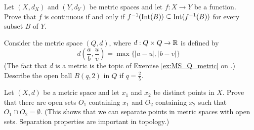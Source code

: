 \item Let $(X, d_X)$ and $(Y, d_Y)$ be metric spaces and let $f: X \to Y$ be a function. Prove that $f$ is continuous if and only if $f^{-1}(\text{Int}(B)) \subseteq \text{Int}(f^{-1}(B))$ for every subset $B$ of $Y$.

\begin{comment}

\ExerciseSolution First suppose that $f$ is continuous. Let $B$ be a subset of $Y$. The fact that $\Int(B)$ is a subset of $B$ implies that $f^{-1}(\Int(B)) \subseteq f^{-1}(B)$. Now $\Int(B)$ is an open set in $Y$, so $f^{-1}(\Int(B))$ is open in $X$. Thus, every point in $f^{-1}(\Int(B))$ is in $\Int(f^{-1}(B))$ and it follows that $f^{-1}(\Int(B)) \subseteq \Int(f^{-1}(B))$.

Now assume that $f^{-1}(\Int(B)) \subseteq \Int(f^{-1}(B))$ for every subset $B$ of $Y$. Let $O$ be an open set in $Y$. Then $O = \Int(O)$ and so $f^{-1}(O) = f^{-1}(\Int(O)) \subseteq \Int(f^{-1}(O))$. Now $\Int(f^{-1}(O)) \subseteq f^{-1}(O)$, so we conclude that  
$f^{-1}(O) = \Int(f^{-1}(O))$. Therefore, $f^{-1}(O)$ is an open set and $f$ is a continuous function.

\end{comment}


\item Consider the metric space $(Q,d)$, where $d : Q \times Q \to \mathbb{R}$ is defined by 
\[d\left(\frac{a}{b}, \frac{u}{v}\right) = \max\{| a-u |, | b-v |\}\]
(The fact that $d$ is a metric is the topic of Exercise \ref{ex:MS_Q_metric} on \pageref{ex:MS_Q_metric}.) Describe the open ball $B(q,2)$ in $Q$ if $q = \frac{2}{5}$.

\begin{comment}

\ExerciseSolution The element $\frac{u}{v}$ in $Q$ is in $B(q,2)$ if 
\[d\left(\frac{2}{5}, \frac{u}{v}\right) = \max\{|a-u|, |b-v|\} < 2.\]
So $|2-u|< 2$ and $|5-v|< 2$. This makes $0 < u < 4$ and $3 < v < 7$. But $u$ and $v$ are integers with no common factors, so
\[B(q,2) = \left\{\frac{1}{4}, \frac{1}{4}, \frac{1}{6}, \frac{2}{5}, \frac{3}{4}, \frac{3}{5} \right\}.\] 

\end{comment}

\item Let $(X,d)$ be a metric space and let $x_1$ and $x_2$ be distinct points in $X$. Prove that there are open sets $O_1$ containing $x_1$ and $O_2$ containing $x_2$ such that $O_1 \cap O_2 = \emptyset$. (This shows that we can separate points in metric spaces with open sets. Separation properties are important in topology.)

